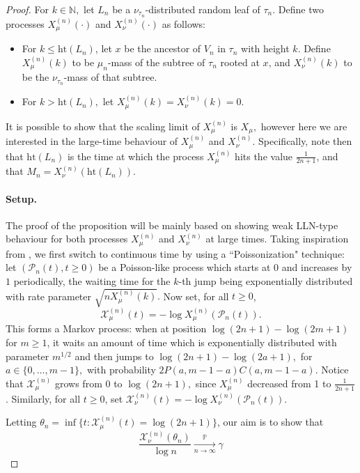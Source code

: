 \documentclass[11pt]{article}
\newcommand{\xnun}{X^{(n)}_{\nu}}
\newcommand{\xmun}{X^{(n)}_{\mu}}
\newcommand{\Xmun}{\mathcal{X}^{(n)}_{\mu}}
\newcommand{\Xnun}{\mathcal{X}^{(n)}_{\nu}}
\newcommand{\dH}{\gamma}
\newcommand{\N}{\mathbb{N}}
\newcommand{\pr}{\mathbb{P}}
\renewcommand{\geq}{\geqslant}
\renewcommand{\leq}{\leqslant}
\newcommand{\h}{\mathrm{ht}}
\begin{document}
\begin{proof} For $k\in\N,$ let $L_n$ be a $\nu_{\tau_n}$-distributed random leaf of $\tau_n.$ Define two processes $\xmun(\cdot)$ and $\xnun(\cdot)$ as follows:
\begin{itemize}
    \item For $k \leq \mathrm{ht}(L_n)$, let $x$ be the ancestor of $V_n$ in $\tau_n$ with height $k$. Define $\xmun(k)$ to be $\mu_n$-mass of the subtree of $\tau_n$ rooted at $x$, and $\xnun(k)$ to be the $\nu_{\tau_n}$-mass of that subtree.
    \item For $ k> \mathrm{ht}(L_n),$ let $\xmun(k)=\xnun(k)=0$.
\end{itemize}
It is possible to show that the scaling limit of $\xmun$ is $X_\mu,$ however here we are interested in the large-time behaviour of $\xmun$ and $\xnun.$ Specifically, note then that $\h(L_n)$ is the time at which the process $X^{(n)}_{\mu}$ hits the value $\frac1{2n+1}$, and that $M_n=X^{(n)}_{\nu}(\h(L_n)).$

\paragraph{Setup.}
The proof of the proposition will be mainly based on showing weak LLN-type behaviour for both processes $X^{(n)}_{\mu}$ and $X^{(n)}_{\nu}$ at large times. Taking inspiration from \cite{BK14}, we first switch to continuous time by using a ``Poissonization" technique: let $(\mathcal{P}_n(t),t\geq 0)$ be a Poisson-like process which starts at $0$ and increases by $1$ periodically, the waiting time for the $k$-th jump being exponentially distributed with rate parameter $\sqrt{nX^{(n)}_{\mu}(k)}.$ Now set, for all $t\geq0$, $$\mathcal{X}^{(n)}_{\mu}(t)=-\log X^{(n)}_{\mu}(\mathcal{P}_n(t)).$$ This forms a Markov process: when at position $\log (2n+1) -\log (2m+1)$ for $m\geq 1$, it waits an amount of time which is exponentially distributed with parameter $m^{1/2}$ and then jumps to $\log (2n+1) -\log (2a+1),$ for $a\in\{0,\ldots,m-1\},$ with probability $2P(a,m-1-a)C(a,m-1-a).$ Notice that $\mathcal{X}^{(n)}_{\mu}$ grows from $0$ to $\log(2n+1),$ since $X^{(n)}_{\mu}$  decreased from 1 to $\frac1{2n+1}$. Similarly, for all $t\geq0$, set $\mathcal{X}^{(n)}_{\nu}(t)=-\log X^{(n)}_{\nu}(\mathcal{P}_n(t))$.

Letting $\theta_n=\inf\{t: \Xmun(t) = \log (2n+1)\}$, our aim is to show that 
\begin{equation}\label{eq:loglimittimeprob0}
\frac{ \Xnun(\theta_n)}{\log n} \underset{n\to\infty}{\overset{\pr}\longrightarrow} \dH   
\end{equation}


\end{proof}
\end{document}
